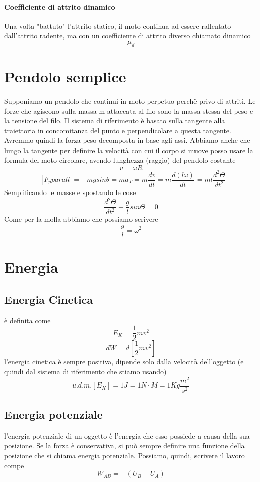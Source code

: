 \documentclass[a4paper]{report}
\begin{document}
  \paragraph{Coefficiente di attrito dinamico}
  Una volta "battuto" l'attrito statico, il moto continua ad essere rallentato dall'attrito radente, ma con un coefficiente di attrito diverso chiamato dinamico
  $$ \mu_d $$


  \section{Pendolo semplice}
  Supponiamo un pendolo che continui in moto perpetuo perchè privo di attriti. Le forze che agiscono sulla massa m attaccata al filo sono la massa stessa del peso e la tensione del filo. Il sistema di riferimento è basato sulla tangente alla traiettoria in concomitanza del punto e perpendicolare a questa tangente. Avremmo quindi la forza peso decomposta in base agli assi.
  Abbiamo anche che lungo la tangente per definire la velocità con cui il corpo si muove posso usare la formula del moto circolare, avendo lunghezza (raggio) del pendolo costante
  $$ v = \omega R$$
  $$- |F_pparall| = - mg sin \theta = m a_T = m \frac{dv}{dt} = m \frac{d(l\omega)}{dt} = ml \frac{d^2 \Theta}{dt^2}$$
  Semplificando le masse e spostando le cose
  $$ \frac{d^2\Theta}{dt^2} + \frac{g}{l} sin \Theta = 0 $$
  Come per la molla abbiamo che possiamo scrivere
  $$ \frac{g}{l} = \omega^2$$

  \section{Energia}
  \subsection{Energia Cinetica}
  è definita come
  $$ E_K = \frac{1}{2}m v^2 $$
  $$ dW = d[\frac{1}{2}m v^2] $$
  l'energia cinetica è sempre positiva, dipende solo dalla velocità dell'oggetto (e quindi dal sistema di riferimento che stiamo usando)
  $$ u.d.m.[E_K]= 1J = 1N\cdot M = 1 Kg \frac{m^2}{s^2}$$

  \subsection{Energia potenziale}
   l'energia potenziale di un oggetto è l'energia che esso possiede a causa della sua posizione.
   Se la forza è conservativa, si può sempre definire una funzione della posizione che si chiama energia potenziale.
   Possiamo, quindi, scrivere il lavoro compe
  $$ W_{AB} = -(U_B - U_A) $$
\end{document}
